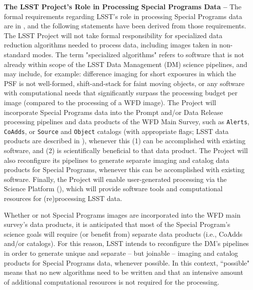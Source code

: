 \documentclass[DM,lsstdoc,toc]{lsstdoc}
\begin{document}
{\bf The LSST Project's Role in Processing Special Programs Data -- } The formal requirements regarding LSST's role in processing Special Programs data are in , and the following statements have been derived from those requirements. The LSST Project will not take formal responsibility for specialized data reduction algorithms needed to process data, including images taken in non-standard modes. The term "specialized algorithms" refers to software that is not already within scope of the LSST Data Management (DM) science pipelines, and may include, for example: difference imaging for short exposures in which the PSF is not well-formed, shift-and-stack for faint moving objects, or any software with computational needs that significantly surpass the processing budget per image (compared to the processing of a WFD image). The Project will incorporate Special Programs data into the Prompt and/or Data Release processing pipelines and data products of the WFD Main Survey, such as {\tt Alerts}, {\tt CoAdds}, or {\tt Source} and {\tt Object} catalogs (with appropriate flags; LSST data products are described in ), whenever this (1) can be accomplished with existing software, and (2) is scientifically beneficial to that data product. The Project will also reconfigure its pipelines to generate separate imaging and catalog data products for Special Programs, whenever this can be accomplished with existing software. Finally, the Project will enable user-generated processing via the Science Platform (), which will provide software tools and computational resources for (re)processing LSST data.

Whether or not Special Programs images are incorporated into the WFD main survey's data products, it is anticipated that most of the Special Program's science goals will require (or benefit from) separate data products (i.e., CoAdds and/or catalogs). For this reason, LSST intends to reconfigure the DM's pipelines in order to generate unique and separate -- but joinable -- imaging and catalog products for Special Programs data, whenever possible. In this context, ``possible" means that no new algorithms need to be written and that an intensive amount of additional computational resources is not required for the processing.
\end{document}
